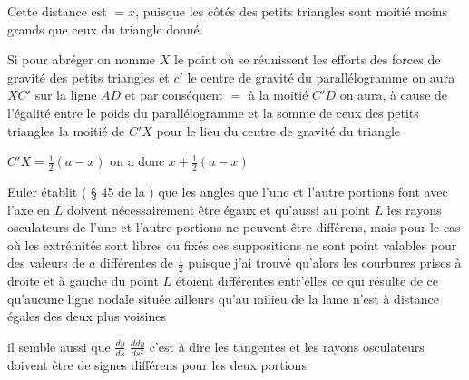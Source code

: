 \documentclass[11pt,a4paper]{article}
\begin{document}

Cette distance est $= x$, puisque les côtés des petits triangles sont moitié moins grands que ceux du triangle donné.

Si pour abréger on nomme $X$ le point où se réunissent les efforts des forces de gravité des petits triangles et $c'$ le centre de gravité du parallélogramme on aura $XC'$ sur la ligne $AD$ et par conséquent $=$ à la moitié $C'D$ on aura, à cause de l'égalité entre le poids du parallélogramme et la somme de ceux des petits triangles la moitié de $C'X$ pour le lieu du centre de gravité du triangle \ill{}

$C'X = \frac{1}{2}(a - x)$ on a donc $x + \frac{1}{2}(a - x)$



Euler établit  ( § 45 de la  ) que les angles que l'une et l'autre portions font avec l'axe en $L$ doivent nécessairement être égaux et qu'aussi au point $L$ les rayons osculateurs de l'une et l'autre portions ne peuvent être différens, mais pour le cas où les extrémités sont libres ou fixés ces suppositions ne sont point valables pour des valeurs de $a$ différentes de $\frac{1}{2}$ puisque j'ai trouvé qu'alors les courbures prises à droite et à gauche du point $L$ étoient différentes entr'elles ce qui résulte de ce qu'aucune ligne nodale située ailleurs qu'au milieu de la lame n'est à distance égales des deux plus voisines

il semble aussi que $\frac{dy}{ds}$ $\frac{ddy}{ds^2}$ c'est à dire les tangentes et les rayons osculateurs doivent être de signes différens pour les deux portions
\end{document}
